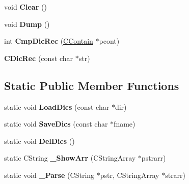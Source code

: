 \begin{DoxyCompactItemize}
\item 
\hypertarget{class_c_dic_rec_af6013ee07977f88ea7198caa21fe078a}{void {\bfseries Clear} ()}\label{class_c_dic_rec_af6013ee07977f88ea7198caa21fe078a}

\item 
\hypertarget{class_c_dic_rec_a3dae3ce1f0e875ec8da44f5495b56c0e}{void {\bfseries Dump} ()}\label{class_c_dic_rec_a3dae3ce1f0e875ec8da44f5495b56c0e}

\item 
\hypertarget{class_c_dic_rec_a1a5ce59dce614735c3f4700292c1da7c}{int {\bfseries Cmp\-Dic\-Rec} (\hyperlink{class_c_contain}{C\-Contain} $\ast$pcont)}\label{class_c_dic_rec_a1a5ce59dce614735c3f4700292c1da7c}

\item 
\hypertarget{class_c_dic_rec_a8fe159204ad850a4f0f6ca8a9898cc52}{{\bfseries C\-Dic\-Rec} (const char $\ast$str)}\label{class_c_dic_rec_a8fe159204ad850a4f0f6ca8a9898cc52}

\end{DoxyCompactItemize}
\subsection*{Static Public Member Functions}
\begin{DoxyCompactItemize}
\item 
\hypertarget{class_c_dic_rec_a33c2a28f96a1225169532b68ee8ab3e8}{static void {\bfseries Load\-Dics} (const char $\ast$dir)}\label{class_c_dic_rec_a33c2a28f96a1225169532b68ee8ab3e8}

\item 
\hypertarget{class_c_dic_rec_a5b357b8228cd0f7b7d30d532812e3314}{static void {\bfseries Save\-Dics} (const char $\ast$fname)}\label{class_c_dic_rec_a5b357b8228cd0f7b7d30d532812e3314}

\item 
\hypertarget{class_c_dic_rec_a1c07f2588335ba059f0800af3aa1244e}{static void {\bfseries Del\-Dics} ()}\label{class_c_dic_rec_a1c07f2588335ba059f0800af3aa1244e}

\item 
\hypertarget{class_c_dic_rec_a6f7248c985f71da47bcd448e40861a86}{static C\-String {\bfseries \-\_\-\-Show\-Arr} (C\-String\-Array $\ast$pstrarr)}\label{class_c_dic_rec_a6f7248c985f71da47bcd448e40861a86}

\item 
\hypertarget{class_c_dic_rec_a914e55b3a3eab9ab9ee9897f63efff71}{static void {\bfseries \-\_\-\-Parse} (C\-String $\ast$pstr, C\-String\-Array $\ast$strarr)}\label{class_c_dic_rec_a914e55b3a3eab9ab9ee9897f63efff71}

\end{DoxyCompactItemize}
